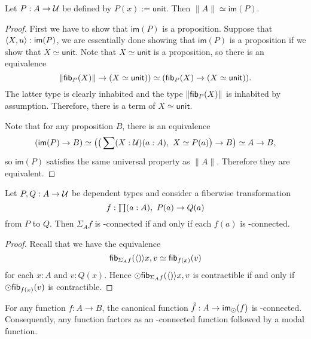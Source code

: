 \begin{lem}
Let $P:A\to\mathcal{U}$ be defined by $P(x):=\mathsf{unit}$. Then
$\|A\|\simeq\mathsf{im}(P)$.
\end{lem}

\begin{proof}
First we have to show that $\mathsf{im}(P)$ is a proposition. Suppose that ${\langle X,u\rangle}:\mathsf{im}(P)$, we are essentially done showing
that
$\mathsf{im}(P)$ is a proposition if we show that $X\simeq \mathsf{unit}$. Note that $X\simeq\mathsf{unit}$ is a proposition, so there is an
equivalence
\begin{equation*}
\|\mathsf{fib}_{P}(X)\|\to (X\simeq\mathsf{unit}))\simeq(\mathsf{fib}_{P}(X)\to(X\simeq\mathsf{unit})).
\end{equation*}
The latter type is clearly inhabited and the type $\|\mathsf{fib}_{P}(X)\|$ is inhabited by assumption. Therefore, there is a term
of $X\simeq\mathsf{unit}$.

Note that for any proposition $B$, there is an equivalence
\begin{equation*}
(\mathsf{im}(P)\to B)\simeq \big(\big(\sum(X:\mathcal{U})(a:A),\ X\simeq P(a)\big)\to B\big) \simeq A\to B,
\end{equation*}
so $\mathsf{im}(P)$ satisfies the same universal property as $\| A\|$. 
Therefore they are equivalent.
\end{proof}

\begin{lem}\label{prop:nconn_fiber_to_total}
Let $P,Q:A\to\mathcal{U}$ be dependent types and consider a fiberwise transformation
\begin{equation*}
f:\prd{a:A} P(a)\to Q(a)
\end{equation*}
from $P$ to $Q$. Then $\Sigma_A f$ is \modal-connected if and only if each $f(a)$ is \modal-connected. 
\end{lem}

\begin{proof}
Recall that we have the equivalence
\begin{equation*}
\mathsf{fib}_{\Sigma_A f}({\langle )\rangle}{x,v}\simeq\mathsf{fib}_{f(x)}(v)
\end{equation*}
for each $x:A$ and $v:Q(x)$. Hence $\odot\mathsf{fib}_{\Sigma_A f}({\langle )\rangle}{x,v}$ is contractible if and only if
$\odot\mathsf{fib}_{f(x)}(v)$ is contractible.
\end{proof}

\begin{lem}\label{prop:to_image_is_connected}
For any function $f:A\to B$, the canonical function $\tilde{f}:A\to\mathsf{im}_{\odot}(f)$ is \modal-connected. 
Consequently, any function factors as an \modal-connected function followed by a modal function.
\end{lem}

